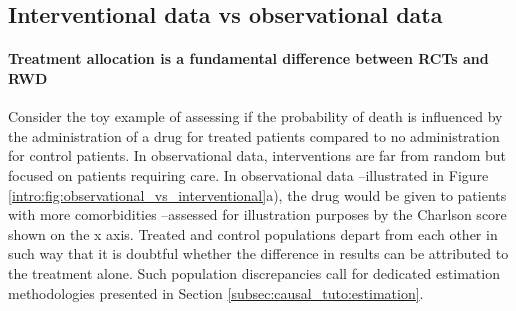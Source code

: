\documentclass[french,12pt,twoside,a4paper]{book}
\begin{document}
\begin{background_box_left}
  \subsection{Interventional data vs observational data}%
  \label{subsec:intro:interventional_vs_observational}%

  \paragraph{Treatment allocation is a fundamental difference between RCTs and RWD}
  Consider the toy example of assessing if the probability of death is
  influenced by \textcolor{I}{the administration of a drug for treated patients}
  compared to \textcolor{C}{no administration for control patients}. In
  observational data, interventions are far from random but focused on patients
  requiring care. In observational data --illustrated in Figure
  \ref{intro:fig:observational_vs_interventional}a), the drug would be given to
  patients with more comorbidities --assessed for illustration purposes by the
  Charlson score \citep{charlson_new_1987} shown on the x axis. Treated and
  control populations depart from each other in such way that it is doubtful
  whether the difference in results can be attributed to the treatment alone.
  Such population discrepancies call for dedicated estimation methodologies
  presented in Section \ref{subsec:causal_tuto:estimation}.

\end{background_box_left}
\end{document}
